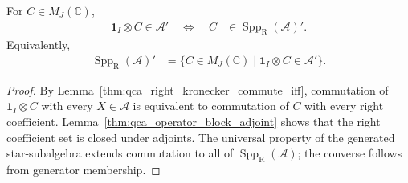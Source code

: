 \begin{lemma}
    \label{thm:qca_right_support_centralizer}
    \leanok
    For $C\in M_J(\mathbb C)$,
    \begin{align}
        \mathbf 1_I\otimes C\in\mathcal A'
        \quad\Longleftrightarrow\quad
        C & \in\operatorname{Spp}_{\mathrm R}(\mathcal A)'.
    \end{align}
    Equivalently,
    \begin{align}
        \operatorname{Spp}_{\mathrm R}(\mathcal A)'
         & =\{C\in M_J(\mathbb C)\mid \mathbf 1_I\otimes C\in\mathcal A'\}.
    \end{align}
\end{lemma}

\begin{proof}\leanok
    By Lemma~\ref{thm:qca_right_kronecker_commute_iff}, commutation of
    $\mathbf 1_I\otimes C$ with every $X\in\mathcal A$ is equivalent to
    commutation of $C$ with every right coefficient.  Lemma~\ref{thm:qca_operator_block_adjoint}
    shows that the right coefficient set is closed under adjoints.  The
    universal property of the generated star-subalgebra extends commutation to
    all of $\operatorname{Spp}_{\mathrm R}(\mathcal A)$; the converse follows
    from generator membership.
\end{proof}

